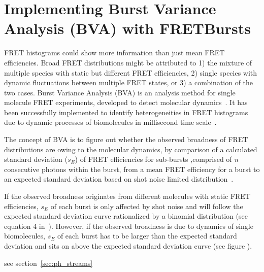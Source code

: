 \section{Implementing Burst Variance Analysis (BVA) with FRETBursts}

FRET histograms could show more information than just mean FRET efficiencies. Broad FRET distributions might be attributed to 1) the mixture of multiple species with static but different FRET efficiencies, 2) single species with dynamic fluctuations between multiple FRET states, or 3) a combination of the two cases. Burst Variance Analysis (BVA) is an analysis method for single molecule FRET experiments, developed to detect molecular dynamics~\cite{Torella_2011}. It has been successfully implemented to identify heterogeneities in FRET histograms due to dynamic processes of biomolecules in millisecond time scale~\cite{Torella_2011, Robb_2013}.

The concept of BVA is to figure out whether the observed broadness of FRET distributions are owing to the molecular dynamics, by comparison of a calculated standard deviation ($s_E$) of FRET efficiencies for sub-bursts ,comprised of \textit{n} consecutive photons within the burst, from a mean FRET efficiency for a burst to an expected standard deviation based on shot noise limited distribution~\cite{Torella_2011}. 

If the observed broadness originates from different molecules with static FRET efficiencies, $s_E$ of each burst is only affected by shot noise and will follow the expected standard deviation curve rationalized by a binomial distribution (see equation 4 in~\cite{Torella_2011}). However, if the observed broadness is due to dynamics of single biomolecules, $s_E$ of each burst has to be larger than the expected standard deviation and sits on above the expected standard deviation curve (see figure ).  



see section~\ref{sec:ph_streams}